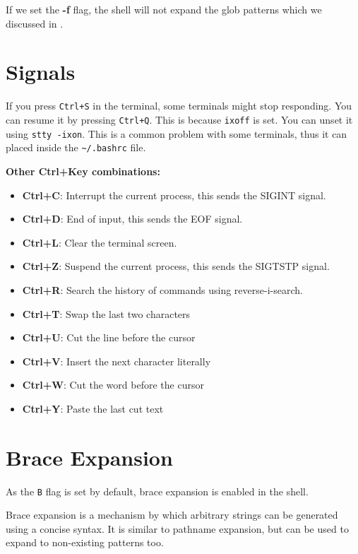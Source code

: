 If we set the \textbf{-f} flag, the shell will not expand the glob patterns which we discussed in .

\section{Signals}

\begin{remark}
  If you press \lstinline{Ctrl+S} in the terminal, some terminals might
  stop responding. You can resume it by pressing \lstinline{Ctrl+Q}.
  This is because \lstinline{ixoff} is set. You can unset
  it using \lstinline{stty -ixon}. This is a common problem with some
  terminals, thus it can placed inside the \lstinline{~/.bashrc} file.
\end{remark}

\textbf{Other Ctrl+Key combinations:}
\begin{itemize}
  \item \textbf{Ctrl+C}: Interrupt the current process, this sends the SIGINT signal.
  \item \textbf{Ctrl+D}: End of input, this sends the EOF signal.
  \item \textbf{Ctrl+L}: Clear the terminal screen.
  \item \textbf{Ctrl+Z}: Suspend the current process, this sends the SIGTSTP signal.
  \item \textbf{Ctrl+R}: Search the history of commands using reverse-i-search.
  \item \textbf{Ctrl+T}: Swap the last two characters
  \item \textbf{Ctrl+U}: Cut the line before the cursor
  \item \textbf{Ctrl+V}: Insert the next character literally
  \item \textbf{Ctrl+W}: Cut the word before the cursor
  \item \textbf{Ctrl+Y}: Paste the last cut text
\end{itemize}

\section{Brace Expansion}

As the \lstinline{B} flag is set by default, brace expansion is enabled in the shell.

\begin{definition}
  Brace expansion is a mechanism by which arbitrary strings can be generated using a concise syntax. It is similar to pathname expansion, but can be used to expand to non-existing patterns too.
\end{definition}

